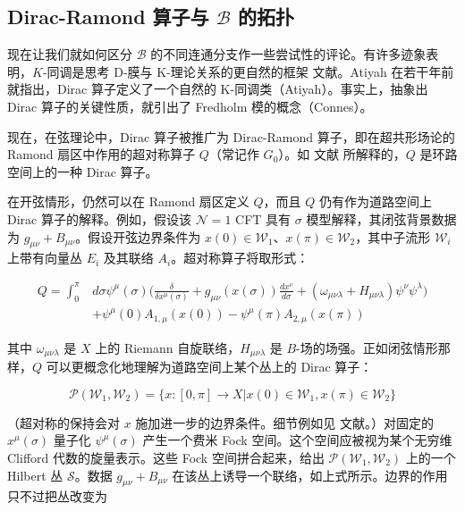 \documentclass[11pt,a4paper]{ctexart}
\begin{document}
\subsection{\texorpdfstring{Dirac-Ramond 算子与 \({\mathcal B}\) 的拓扑}{Dirac-Ramond 算子与 \{\textbackslash mathcal B\} 的拓扑}}\label{dirac-ramond-ux7b97ux5b50ux4e0e-mathcal-b-ux7684ux62d3ux6251}

现在让我们就如何区分 \({\mathcal B}\) 的不同连通分支作一些尝试性的评论。有许多迹象表明，\(K\)-同调是思考 D-膜与 K-理论关系的更自然的框架 文献。Atiyah 在若干年前就指出，Dirac 算子定义了一个自然的 K-同调类（Atiyah）。事实上，抽象出 Dirac 算子的关键性质，就引出了 Fredholm 模的概念（Connes）。

现在，在弦理论中，Dirac 算子被推广为 Dirac-Ramond 算子，即在超共形场论的 Ramond 扇区中作用的超对称算子 \(Q\)（常记作 \(G_0\)）。如 文献 所解释的，\(Q\) 是环路空间上的一种 Dirac 算子。

在开弦情形，仍然可以在 Ramond 扇区定义 \(Q\)，而且 \(Q\) 仍有作为道路空间上 Dirac 算子的解释。例如，假设该 \({\mathcal N}=1\) CFT 具有 \(\sigma\) 模型解释，其闭弦背景数据为 \(g_{\mu\nu}+B_{\mu\nu}\)。假设开弦边界条件为 \(x(0)\in {\mathcal W}_1\)、\(x(\pi) \in {\mathcal W}_2\)，其中子流形 \({\mathcal W}_i\) 上带有向量丛 \(E_i\) 及其联络 \(A_i\)。超对称算子将取形式：

\[\begin{matrix}
Q = \int_0^\pi & d\sigma \psi^\mu(\sigma) \Biggl(
\frac{\delta}{\delta x^\mu(\sigma)}  + g_{\mu\nu}(x(\sigma))\frac{dx^\nu}{d \sigma}
+ \left( \omega_{\mu\nu\lambda} + H_{\mu\nu\lambda} \right) \psi^\nu \psi^\lambda
\Biggr) \\
& + \psi^\mu(0) A_{1,\mu}(x(0)) - \psi^\mu(\pi) A_{2,\mu}(x(\pi))
\end{matrix}\]

其中 \(\omega_{\mu\nu\lambda}\) 是 \(X\) 上的 Riemann 自旋联络，\(H_{\mu\nu\lambda}\) 是 \(B\)-场的场强。正如闭弦情形那样，\(Q\) 可以更概念化地理解为道路空间上某个丛上的 Dirac 算子：

\[{\mathcal P }({\mathcal W}_1,{\mathcal W}_2) = \{ x:[0,\pi] \to X \vert x(0)\in {\mathcal W}_1, x(\pi)\in {\mathcal W}_2\}\]

（超对称的保持会对 \(x\) 施加进一步的边界条件。细节例如见 文献。）对固定的 \(x^\mu(\sigma)\) 量子化 \(\psi^\mu(\sigma)\) 产生一个费米 Fock 空间。这个空间应被视为某个无穷维 Clifford 代数的旋量表示。这些 Fock 空间拼合起来，给出 \({\mathcal P }({\mathcal W}_1,{\mathcal W}_2)\) 上的一个 Hilbert 丛 \({\mathcal S }\)。数据 \(g_{\mu\nu} + B_{\mu\nu}\) 在该丛上诱导一个联络，如上式所示。边界的作用只不过把丛改变为
\end{document}
